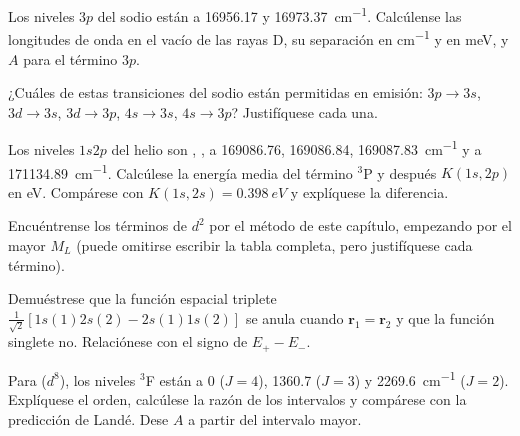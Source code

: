 \begin{exercise}[$\star\star$]\label{exo:b3:many-electron-atoms:6}
Los niveles $3p$ del sodio están a 16956.17 y \qty{16973.37}{cm^{-1}}. Calcúlense
las longitudes de onda en el vacío de las rayas D, su separación en \unit{cm^{-1}} y
en meV, y $A$ para el término $3p$.
\end{exercise}

\begin{exercise}[$\star\star$]\label{exo:b3:many-electron-atoms:7}
¿Cuáles de estas transiciones del sodio están permitidas en emisión: $3p \to 3s$,
$3d \to 3s$, $3d \to 3p$, $4s \to 3s$, $4s \to 3p$? Justifíquese cada una.
\end{exercise}

\begin{exercise}[$\star\star$]\label{exo:b3:many-electron-atoms:8}
Los niveles $1s2p$ del helio son , ,
 a 169086.76, 169086.84, \qty{169087.83}{cm^{-1}} y
 a \qty{171134.89}{cm^{-1}}. Calcúlese la energía media del
término ${}^3$P y después $K(1s,2p)$ en eV. Compárese con $K(1s,2s) = \qty{0.398}{eV}$
y explíquese la diferencia.
\end{exercise}

\begin{exercise}[$\star\star$]\label{exo:b3:many-electron-atoms:9}
Encuéntrense los términos de $d^2$ por el método de este capítulo, empezando por el
mayor $M_L$ (puede omitirse escribir la tabla completa, pero justifíquese cada término).
\end{exercise}

\begin{exercise}[$\star\star\star$]\label{exo:b3:many-electron-atoms:10}
Demuéstrese que la función espacial triplete $\frac{1}{\sqrt2}[1s(1)2s(2) -
2s(1)1s(2)]$ se anula cuando $\mathbf r_1 = \mathbf r_2$ y que la función singlete
no. Relaciónese con el signo de $E_+ - E_-$.
\end{exercise}

\begin{exercise}[$\star\star\star$]\label{exo:b3:many-electron-atoms:11}
Para  ($d^8$), los niveles ${}^3$F están a 0 ($J = 4$), 1360.7 ($J = 3$)
y \qty{2269.6}{cm^{-1}} ($J = 2$). Explíquese el orden, calcúlese la razón de
los intervalos y compárese con la predicción de Landé. Dese $A$ a partir del intervalo
mayor.
\end{exercise}

